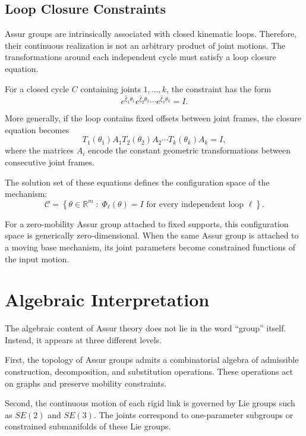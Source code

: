 \subsection{Loop Closure Constraints}

Assur groups are intrinsically associated with closed kinematic loops. Therefore, their continuous realization is not an arbitrary product of joint motions. The transformations around each independent cycle must satisfy a loop closure equation.

For a closed cycle $C$ containing joints $1,\dots,k$, the constraint has the form
\begin{equation}
e^{\hat{\xi}_1 \theta_1}
e^{\hat{\xi}_2 \theta_2}
\cdots
e^{\hat{\xi}_k \theta_k}
=
I.
\end{equation}

More generally, if the loop contains fixed offsets between joint frames, the closure equation becomes
\begin{equation}
T_1(\theta_1)A_1
T_2(\theta_2)A_2
\cdots
T_k(\theta_k)A_k
=
I,
\end{equation}
where the matrices $A_i$ encode the constant geometric transformations between consecutive joint frames.

The solution set of these equations defines the configuration space of the mechanism:
\begin{equation}
\mathcal{C}
=
\left\{
\theta \in \mathbb{R}^m
\;:\;
\Phi_\ell(\theta) = I
\text{ for every independent loop } \ell
\right\}.
\end{equation}

For a zero-mobility Assur group attached to fixed supports, this configuration space is generically zero-dimensional. When the same Assur group is attached to a moving base mechanism, its joint parameters become constrained functions of the input motion.

\section{Algebraic Interpretation}

The algebraic content of Assur theory does not lie in the word ``group'' itself. Instead, it appears at three different levels.

First, the topology of Assur groups admits a combinatorial algebra of admissible construction, decomposition, and substitution operations. These operations act on graphs and preserve mobility constraints.

Second, the continuous motion of each rigid link is governed by Lie groups such as $SE(2)$ and $SE(3)$. The joints correspond to one-parameter subgroups or constrained submanifolds of these Lie groups.

